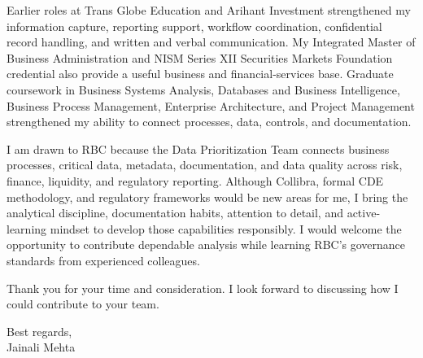 \documentclass[letterpaper,11pt]{article}
\begin{document}
\bigbreak
Earlier roles at Trans Globe Education and Arihant Investment strengthened my information capture, reporting support, workflow coordination, confidential record handling, and written and verbal communication. My Integrated Master of Business Administration and NISM Series XII Securities Markets Foundation credential also provide a useful business and financial-services base. Graduate coursework in Business Systems Analysis, Databases and Business Intelligence, Business Process Management, Enterprise Architecture, and Project Management strengthened my ability to connect processes, data, controls, and documentation.

\bigbreak
I am drawn to RBC because the Data Prioritization Team connects business processes, critical data, metadata, documentation, and data quality across risk, finance, liquidity, and regulatory reporting. Although Collibra, formal CDE methodology, and regulatory frameworks would be new areas for me, I bring the analytical discipline, documentation habits, attention to detail, and active-learning mindset to develop those capabilities responsibly. I would welcome the opportunity to contribute dependable analysis while learning RBC's governance standards from experienced colleagues.

\bigbreak
Thank you for your time and consideration. I look forward to discussing how I could contribute to your team.

\bigbreak
Best regards,\\
Jainali Mehta
\end{document}
